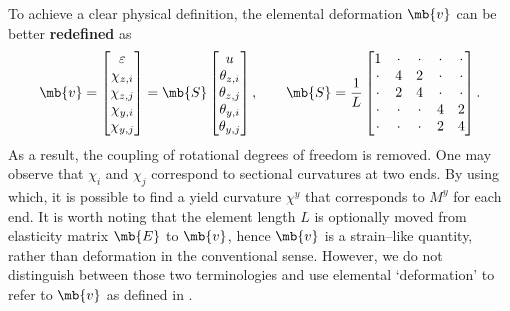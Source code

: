 To achieve a clear physical definition, the elemental deformation $\mb{v}$ can be better \textbf{redefined} as
\begin{gather}\label{nm:kinematics}
\mb{v}=\begin{bmatrix}
\varepsilon\\\chi_{z,i}\\\chi_{z,j}\\\chi_{y,i}\\\chi_{y,j}
\end{bmatrix}=\mb{S}\begin{bmatrix}
u\\\theta_{z,i}\\\theta_{z,j}\\\theta_{y,i}\\\theta_{y,j}
\end{bmatrix},\qquad\mb{S}=\dfrac{1}{L}\begin{bmatrix}
1&\cdot&\cdot&\cdot&\cdot\\
\cdot&4&2&\cdot&\cdot\\
\cdot&2&4&\cdot&\cdot\\
\cdot&\cdot&\cdot&4&2\\
\cdot&\cdot&\cdot&2&4
\end{bmatrix}.
\end{gather}
As a result, the coupling of rotational degrees of freedom is removed. One may observe that $\chi_i$ and $\chi_j$ correspond to sectional curvatures at two ends. By using which, it is possible to find a yield curvature $\chi^y$ that corresponds to $M^y$ for each end. It is worth noting that the element length $L$ is optionally moved from elasticity matrix $\mb{E}$ to $\mb{v}$, hence $\mb{v}$ is a strain--like quantity, rather than deformation in the conventional sense. However, we do not distinguish between those two terminologies and use elemental `deformation' to refer to $\mb{v}$ as defined in .

